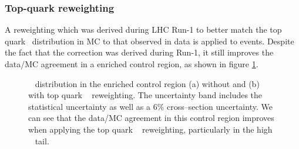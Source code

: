 \subsubsection*{Top-quark \pT reweighting}
A reweighting which was derived during \ac{LHC} Run-1
to better match the top quark \pT~distribution in \ac{MC}
to that observed in data is applied to \ttbar events. Despite
the fact that the correction was derived during Run-1, it still
improves the data/\ac{MC} agreement in a \ttbar enriched
control region, as shown in figure \ref{fig:mssm_corrs_toppt}.
\begin{figure}[h!]
\begin{center}
\end{center}
\label{fig:mssm_corrs_toppt}
\caption{\mTtot~ distribution in the \ttbar enriched control region
 (a) without and (b) with top quark \pT~ reweighting. The uncertainty band includes
the statistical uncertainty as well as a 6\% \ttbar cross--section uncertainty. We can see
that the data/\ac{MC} agreement in this control region improves when applying the top quark \pT~
reweighting, particularly in the high \mTtot~ tail.}
\end{figure}
